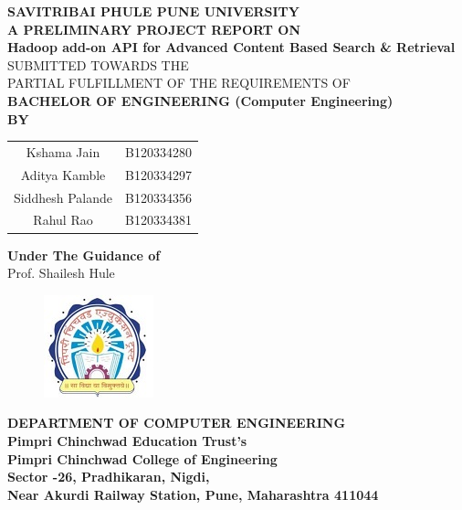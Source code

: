\documentclass[oneside,a4paper,12pt]{report}
\begin{document}
\newpage

\begin{center}

\thispagestyle{empty}
\textbf{SAVITRIBAI PHULE PUNE UNIVERSITY} \\[4ex]
\textbf{A PRELIMINARY PROJECT REPORT ON}  \\[8ex]
\textbf{ \Large Hadoop add-on API for Advanced Content Based Search \& Retrieval} \\[8ex]

SUBMITTED TOWARDS THE \\
PARTIAL FULFILLMENT OF THE REQUIREMENTS OF \\[4ex]

\textbf{BACHELOR OF ENGINEERING (Computer Engineering)} \\[4ex]

\textbf{BY} \\[4ex]


\begin{tabular}{cc}
Kshama Jain & B120334280 \\
Aditya Kamble & B120334297 \\
Siddhesh Palande & B120334356 \\
Rahul Rao & B120334381 \\[4ex]
\end{tabular}


\textbf{Under The Guidance of} \\[4ex]
Prof. Shailesh Hule \\[4ex]

\begin{figure}[h]
\includegraphics{college_logo}
\centering
\end{figure}

\textbf{DEPARTMENT OF COMPUTER ENGINEERING} \\[4ex]
\textbf{Pimpri Chinchwad Education Trust's \\ \large Pimpri Chinchwad College of Engineering} \\[4ex]
\textbf{Sector -26, Pradhikaran, Nigdi, \\ Near Akurdi Railway Station, Pune, Maharashtra 411044}

\end{center}
\end{document}
